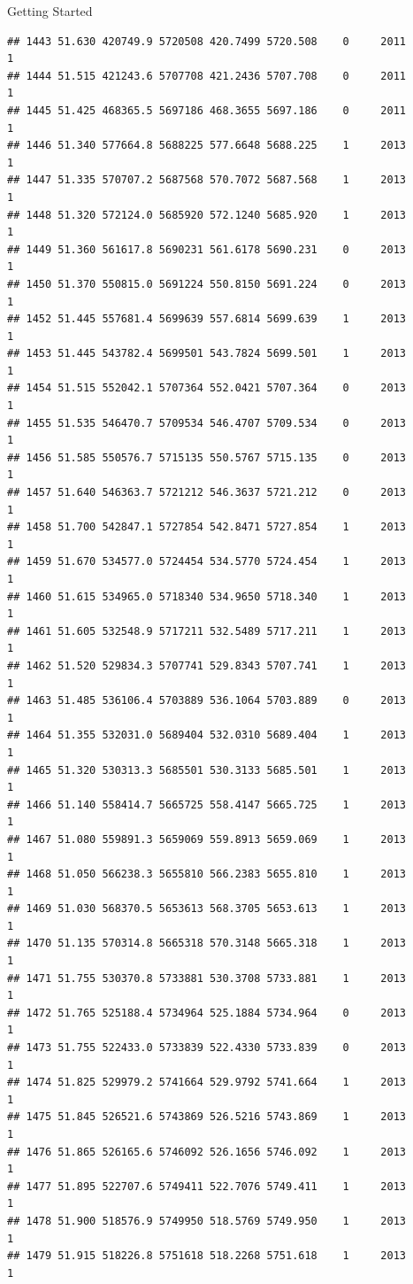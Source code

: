 \documentclass[
  ignorenonframetext,
]{beamer}
\begin{document}
\begin{frame}[fragile]{Getting Started}
\begin{verbatim}
## 1443 51.630 420749.9 5720508 420.7499 5720.508    0     2011        1
## 1444 51.515 421243.6 5707708 421.2436 5707.708    0     2011        1
## 1445 51.425 468365.5 5697186 468.3655 5697.186    0     2011        1
## 1446 51.340 577664.8 5688225 577.6648 5688.225    1     2013        1
## 1447 51.335 570707.2 5687568 570.7072 5687.568    1     2013        1
## 1448 51.320 572124.0 5685920 572.1240 5685.920    1     2013        1
## 1449 51.360 561617.8 5690231 561.6178 5690.231    0     2013        1
## 1450 51.370 550815.0 5691224 550.8150 5691.224    0     2013        1
## 1452 51.445 557681.4 5699639 557.6814 5699.639    1     2013        1
## 1453 51.445 543782.4 5699501 543.7824 5699.501    1     2013        1
## 1454 51.515 552042.1 5707364 552.0421 5707.364    0     2013        1
## 1455 51.535 546470.7 5709534 546.4707 5709.534    0     2013        1
## 1456 51.585 550576.7 5715135 550.5767 5715.135    0     2013        1
## 1457 51.640 546363.7 5721212 546.3637 5721.212    0     2013        1
## 1458 51.700 542847.1 5727854 542.8471 5727.854    1     2013        1
## 1459 51.670 534577.0 5724454 534.5770 5724.454    1     2013        1
## 1460 51.615 534965.0 5718340 534.9650 5718.340    1     2013        1
## 1461 51.605 532548.9 5717211 532.5489 5717.211    1     2013        1
## 1462 51.520 529834.3 5707741 529.8343 5707.741    1     2013        1
## 1463 51.485 536106.4 5703889 536.1064 5703.889    0     2013        1
## 1464 51.355 532031.0 5689404 532.0310 5689.404    1     2013        1
## 1465 51.320 530313.3 5685501 530.3133 5685.501    1     2013        1
## 1466 51.140 558414.7 5665725 558.4147 5665.725    1     2013        1
## 1467 51.080 559891.3 5659069 559.8913 5659.069    1     2013        1
## 1468 51.050 566238.3 5655810 566.2383 5655.810    1     2013        1
## 1469 51.030 568370.5 5653613 568.3705 5653.613    1     2013        1
## 1470 51.135 570314.8 5665318 570.3148 5665.318    1     2013        1
## 1471 51.755 530370.8 5733881 530.3708 5733.881    1     2013        1
## 1472 51.765 525188.4 5734964 525.1884 5734.964    0     2013        1
## 1473 51.755 522433.0 5733839 522.4330 5733.839    0     2013        1
## 1474 51.825 529979.2 5741664 529.9792 5741.664    1     2013        1
## 1475 51.845 526521.6 5743869 526.5216 5743.869    1     2013        1
## 1476 51.865 526165.6 5746092 526.1656 5746.092    1     2013        1
## 1477 51.895 522707.6 5749411 522.7076 5749.411    1     2013        1
## 1478 51.900 518576.9 5749950 518.5769 5749.950    1     2013        1
## 1479 51.915 518226.8 5751618 518.2268 5751.618    1     2013        1

\end{verbatim}
\end{frame}
\end{document}
